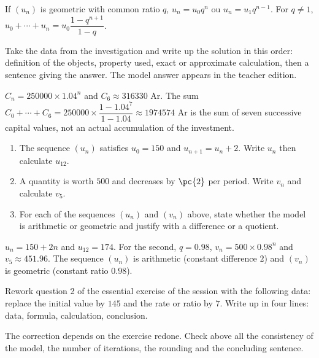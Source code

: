 \begin{summary}If $(u_n)$ is geometric with common ratio $q$, $u_n=u_0q^n$ ou $u_n=u_1q^{n-1}$. For $q\neq1$, $u_0+\cdots+u_n=u_0\dfrac{1-q^{n+1}}{1-q}$.\end{summary}

\begin{example}
Take the data from the investigation and write up the solution in this order: definition of the objects, property used, exact or approximate calculation, then a sentence giving the answer. The model answer appears in the teacher edition.
\end{example}
\begin{solution}$C_n=\num{250000}\times\num{1,04}^n$ and $C_6\approx\num{316330}$ Ar. The sum $C_0+\cdots+C_6=\num{250000}\times\dfrac{1-\num{1,04}^7}{1-\num{1,04}}\approx\num{1974574}$ Ar is the sum of seven successive capital values, not an actual accumulation of the investment.\end{solution}

\begin{exercise}[essential]
\begin{enumerate}\item The sequence $(u_n)$ satisfies $u_0=150$ and $u_{n+1}=u_n+2$. Write $u_n$ then calculate $u_{12}$.\item A quantity is worth $500$ and decreases by $\pc{2}$ per period. Write $v_n$ and calculate $v_5$.\item For each of the sequences $(u_n)$ and $(v_n)$ above, state whether the model is arithmetic or geometric and justify with a difference or a quotient.\end{enumerate}
\end{exercise}
\begin{solution}$u_n=150+2n$ and $u_{12}=174$. For the second, $q=\num{0,98}$, $v_n=500\times\num{0,98}^n$ and $v_5\approx\num{451,96}$. The sequence $(u_n)$ is arithmetic (constant difference $2$) and $(v_n)$ is geometric (constant ratio $\num{0,98}$).\end{solution}


\begin{homework}Rework question 2 of the essential exercise of the session with the following data: replace the initial value by $145$ and the rate or ratio by $7$. Write up in four lines: data, formula, calculation, conclusion.\end{homework}
\begin{solution}The correction depends on the exercise redone. Check above all the consistency of the model, the number of iterations, the rounding and the concluding sentence.\end{solution}

